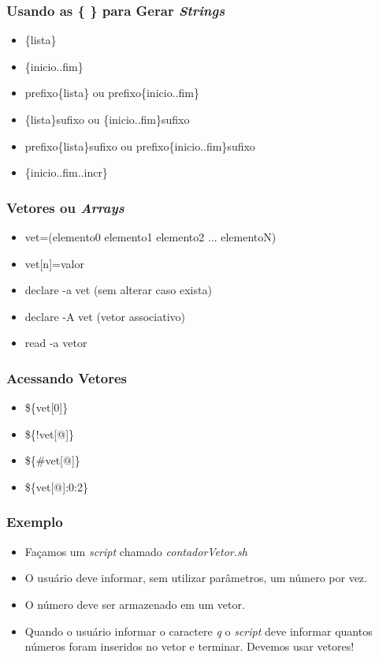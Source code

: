 \documentclass{beamer}
\begin{document}
   \begin{frame}
      \frametitle{Usando as \{ \} para Gerar \textit{Strings}}
      \begin{itemize}
         \item \{lista\}
	 \item \{inicio..fim\}
	 \item prefixo\{lista\} ou prefixo\{inicio..fim\}
	 \item \{lista\}sufixo ou \{inicio..fim\}sufixo
	 \item prefixo\{lista\}sufixo ou prefixo\{inicio..fim\}sufixo
	 \item \{inicio..fim..incr\}
      \end{itemize}
   \end{frame}

   \begin{frame}
      \frametitle{Vetores ou \textit{Arrays}}
      \begin{itemize}
         \item vet=(elemento0 elemento1 elemento2 ... elementoN)
	 \item vet[n]=valor
	 \item declare -a vet (sem alterar caso exista)
	 \item declare -A vet (vetor associativo)
	 \item read -a vetor
      \end{itemize}
   \end{frame}

   \begin{frame}
      \frametitle{Acessando Vetores}
      \begin{itemize}
         \item \$\{vet[0]\}
         \item \$\{!vet[@]\}
	 \item \$\{\#vet[@]\}
	 \item \$\{vet[@]:0:2\}
      \end{itemize}
   \end{frame}
   
   \begin{frame}
      \frametitle{Exemplo}
      \begin{itemize}
         \item Façamos um \textit{script} chamado \textit{contadorVetor.sh} 
	 \item O usuário deve informar, sem utilizar parâmetros, um número por vez.
	 \item O número deve ser armazenado em um vetor. 
	 \item Quando o usuário informar o caractere \textit{q} o \textit{script} deve informar quantos números foram inseridos no vetor e terminar. Devemos usar vetores!
      \end{itemize}
   \end{frame}
\end{document}

